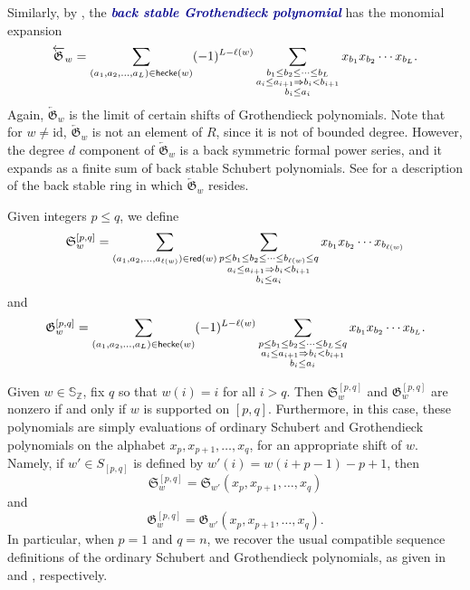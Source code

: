 \documentclass[12 pt]{amsart}
\newcommand{\newword}[1]{\textcolor{darkblue}{\textbf{\emph{#1}}}}
\newcommand{\id}{\mathrm{id}}
\newcommand{\redword}{{\sf red}}
\newcommand{\heckeword}{{\sf hecke}}
\numberwithin{equation}{section}
\theoremstyle{remark}
\begin{document}
		Similarly, by \cite[Proposition~4.4]{Lam.Lee.Shimozono-K-theory}, the \newword{back stable Grothendieck polynomial} has the monomial expansion
		\begin{equation}
			\label{eqn:backgrothcompat}
			\overleftarrow{\mathfrak{G}}_w = \sum_{(a_1,a_2,\ldots,a_L) \in\heckeword(w)}(-1)^{L-\ell(w)}
			\sum_{\substack{
					b_1\leq b_2\leq \cdots \leq b_L \\
					a_i\leq a_{i + 1}\Rightarrow b_i < b_{i + 1}\\
					b_i\leq a_i}
				} 
			x_{b_1} x_{b_2} \cdots x_{b_L}.
		\end{equation}
		Again, $\overleftarrow{\mathfrak{G}}_w$ is the limit of certain shifts of Grothendieck polynomials.
		Note that for $w \neq \id$, $\overleftarrow{\mathfrak{G}}_w$ is not an element of $R$, since it is not of bounded degree. 
		However, the degree $d$ component of $\overleftarrow{\mathfrak{G}}_w$ is a back symmetric formal power series, and it expands as a finite sum of back stable Schubert polynomials. 
		See \cite[Section~4.1]{Lam.Lee.Shimozono-K-theory} for a description of the back stable ring in which $\overleftarrow{\mathfrak{G}}_w$ resides.
		
		Given integers $p \leq q$, we define
		\[\mathfrak{S}^{[p,q]}_w = \sum_{(a_1,a_2,\ldots,a_{\ell(w)}) \in\redword(w)}
		\sum_{\substack{
				p\leq b_1\leq b_2\leq \cdots \leq b_{\ell(w)}\leq q\\
				a_i\leq a_{i + 1}\Rightarrow b_i < b_{i + 1}\\
				b_i\leq a_i}
		} 
		x_{b_1}x_{b_2}\cdots x_{b_{\ell(w)}}\]
		and
		\[\mathfrak{G}^{[p,q]}_w = \sum_{(a_1,a_2,\ldots,a_L) \in\heckeword(w)}(-1)^{L-\ell(w)}
		\sum_{\substack{p\leq b_1\leq b_2\leq \cdots \leq b_L \leq q\\
				a_i\leq a_{i + 1}\Rightarrow b_i < b_{i + 1}\\
				b_i\leq a_i}
			} 
		x_{b_1}x_{b_2}\cdots x_{b_L}.\] 
				
		Given $w\in \mathbb S_{\mathbb Z}$, fix $q$ so that $w(i) = i$ for all $i > q$. 
		Then $\mathfrak{S}^{[p,q]}_w$ and $\mathfrak{G}^{[p,q]}_w$ are nonzero if and only if $w$ is supported on $[p,q]$.
		Furthermore, in this case, these polynomials are simply evaluations of ordinary Schubert and Grothendieck polynomials on the alphabet $x_p, x_{p + 1},\ldots, x_{q}$, for an appropriate shift of $w$. 
		Namely, if $w'\in S_{[p,q]}$ is defined by $w'(i)=w(i+p-1)-p+1$, then
		\[\mathfrak S_w^{[p,q]}=\mathfrak S_{w'}(x_p,x_{p+1},\ldots,x_q)\]
		and
		\[\mathfrak G_w^{[p,q]}=\mathfrak G_{w'}(x_p,x_{p+1},\ldots,x_q).\]
		In particular, when $p = 1$ and $q=n$, we recover the usual compatible sequence definitions of the ordinary Schubert and Grothendieck polynomials, as given in \cite{BJS93} and \cite{Fomin.Kirillov}, respectively.
				
\end{document}
